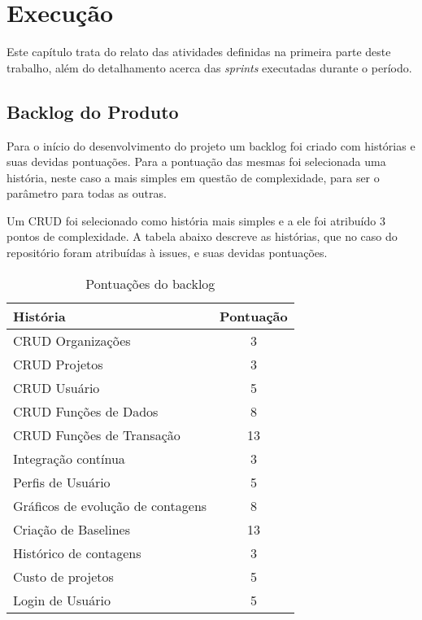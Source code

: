 \chapter[Execução]{Execução}

Este capítulo trata do relato das atividades definidas na primeira parte deste trabalho, além do detalhamento acerca das \textit{sprints} executadas durante o período.

\section{Backlog do Produto}

Para o início do desenvolvimento do projeto um backlog foi criado com histórias e suas devidas pontuações. Para a pontuação das mesmas foi selecionada uma história, neste caso a mais simples em questão de complexidade, para ser o parâmetro para todas as outras.

Um CRUD foi selecionado como história mais simples e a ele foi atribuído 3 pontos de complexidade. A tabela abaixo descreve as histórias, que no caso do repositório foram atribuídas à issues, e suas devidas pontuações.

\begin{table}[h]
\centering
\label{backlog}
\begin{tabular}{|l|c|}
\hline
\textbf{História}                 & \textbf{Pontuação} \\ \hline
CRUD Organizações                 & 3                  \\ \hline
CRUD Projetos                     & 3                  \\ \hline
CRUD Usuário                      & 5                  \\ \hline
CRUD Funções de Dados             & 8                  \\ \hline
CRUD Funções de Transação         & 13                 \\ \hline
Integração contínua               & 3                  \\ \hline
Perfis de Usuário                 & 5                  \\ \hline
Gráficos de evolução de contagens & 8                  \\ \hline
Criação de Baselines              & 13                 \\ \hline
Histórico de contagens            & 3                  \\ \hline
Custo de projetos                 & 5                  \\ \hline
Login de Usuário                  & 5                  \\ \hline
\end{tabular}
\caption{Pontuações do backlog}
\end{table}

